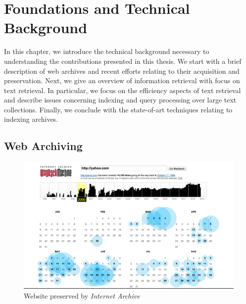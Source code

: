 \chapter{Foundations and Technical Background}
\label{chap:foundations}


In this chapter, we introduce the technical background necessary to understanding the contributions presented in this thesis. We start with a brief description of web archives and recent efforts relating to their acquisition and preservation. Next, we give an overvi\-ew of information retrieval with focus on text retrieval. In particular, we focus on the efficiency aspects of text retrieval and describe issues concerning indexing and query processing over large text collections. Finally, we conclude with the state-of-art techniques relating to indexing archives.


\section{Web Archiving} 

  \begin{figure}[tb]
  \centering
    \includegraphics[width=\columnwidth]{resources/wayback_machine.pdf}
  \caption{Website preserved by \emph{Internet Archive}} 
    \label{fig:ia_example}
\end{figure}


